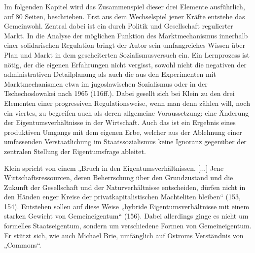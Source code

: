 \begin{multicols*}{2}
    Im folgenden Kapitel wird das Zusammenspiel dieser drei Elemente ausführlich, auf 80 Seiten, beschrieben. Erst aus dem Wechselspiel jener Kräfte entstehe das Gemeinwohl. Zentral dabei ist ein durch Politik und Gesellschaft regulierter Markt. In die Analyse der möglichen Funktion des Marktmechanismus innerhalb einer solidarischen Regulation bringt der Autor sein umfangreiches Wissen über Plan und Markt in dem gescheiterten Sozialismusversuch ein. Ein Lernprozess ist nötig, der die eigenen Erfahrungen nicht vergisst, sowohl nicht die negativen der administrativen Detailplanung als auch die aus den Experimenten mit Marktmechanismen etwa im jugoslawischen Sozialismus oder in der Tschechoslowakei nach 1965 (116ff.). Dabei gesellt sich bei Klein zu den drei Elementen einer progressiven Regulationsweise, wenn man denn zählen will, noch ein viertes, zu begreifen auch als deren allgemeine Voraussetzung: eine Änderung der Eigentumsverhältnisse in der Wirtschaft. Auch das ist ein Ergebnis eines produktiven Umgangs mit dem eigenen Erbe, welcher aus der Ablehnung einer umfassenden Verstaatlichung im Staatssozialismus keine Ignoranz gegenüber der zentralen Stellung der Eigentumsfrage ableitet. 

    Klein spricht von einem „Bruch in den Eigentumsverhältnissen. [...] Jene Wirtschaftsressourcen, deren Beherrschung über den Grundzustand und die Zukunft der Gesellschaft und der Naturverhältnisse entscheiden, dürfen nicht in den Händen enger Kreise der privatkapitalistischen Machteliten bleiben“ (153, 154). Entstehen sollen auf diese Weise „hybride Eigentumsverhältnisse mit einem starken Gewicht von Gemeineigentum“ (156). Dabei allerdings ginge es nicht um formelles Staatseigentum, sondern um verschiedene Formen von Gemeineigentum. Er stützt sich, wie auch Michael Brie, umfänglich auf Ostroms Verständnis von „Commons“. 


\end{multicols*}
